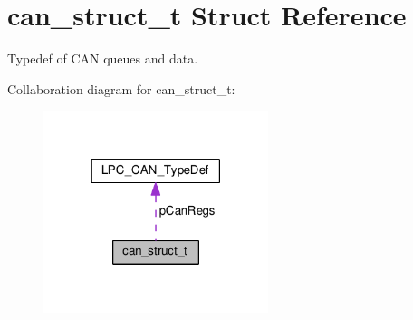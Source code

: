 \hypertarget{structcan__struct__t}{}\section{can\+\_\+struct\+\_\+t Struct Reference}
\label{structcan__struct__t}


Typedef of C\+AN queues and data.  




Collaboration diagram for can\+\_\+struct\+\_\+t\+:\nopagebreak
\begin{figure}[H]
\begin{center}
\leavevmode
\includegraphics[width=186pt]{d1/dcd/structcan__struct__t__coll__graph}
\end{center}
\end{figure}
